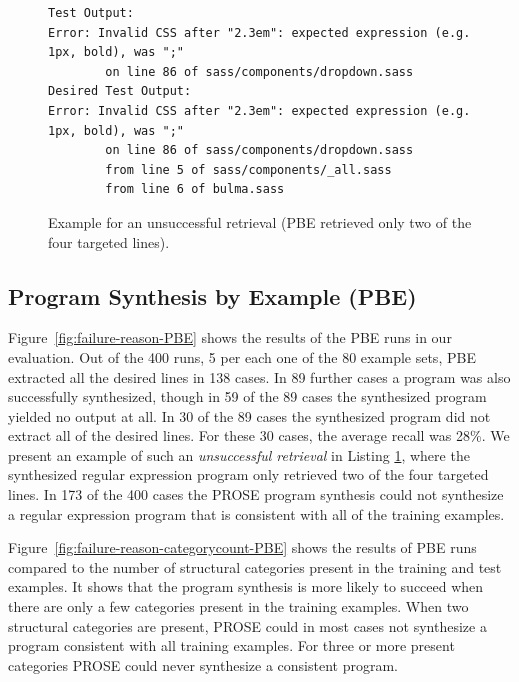 \documentclass[\myrootdir/main.tex]{subfiles}
\begin{document}
\begin{figure}[hb]
  \centering
  \begin{lstlisting}[breaklines=true]
Test Output:
Error: Invalid CSS after "2.3em": expected expression (e.g. 1px, bold), was ";"
        on line 86 of sass/components/dropdown.sass   
Desired Test Output:
Error: Invalid CSS after "2.3em": expected expression (e.g. 1px, bold), was ";"
        on line 86 of sass/components/dropdown.sass
        from line 5 of sass/components/_all.sass
        from line 6 of bulma.sass
  \end{lstlisting}  
  \caption{Example for an unsuccessful retrieval (PBE retrieved only two of the four targeted lines).}
  \label{lst:pbe-unsuccessful}
\end{figure}


\subsection{Program Synthesis by Example (PBE)}
Figure~\ref{fig:failure-reason-PBE} shows the results of the PBE runs in our evaluation.
Out of the 400 runs, 5 per each one of the 80 example sets, PBE extracted all the desired lines in 138 cases.
In 89 further cases a program was also successfully synthesized, though in 59 of the 89 cases the synthesized program yielded no output at all.
In 30 of the 89 cases the synthesized program did not extract all of the desired lines.
For these 30 cases, the average recall was 28\%.
We present an example of such an \emph{unsuccessful retrieval} in Listing \ref{lst:pbe-unsuccessful}, where the synthesized regular expression program only retrieved two of the four targeted lines.
In 173 of the 400 cases the PROSE program synthesis could not synthesize a regular expression program that is consistent with all of the training examples.

Figure~\ref{fig:failure-reason-categorycount-PBE} shows the results of PBE runs compared to the number of structural categories present in the training and test examples.
It shows that the program synthesis is more likely to succeed when there are only a few categories present in the training examples.
When two structural categories are present, PROSE could in most cases not synthesize a program consistent with all training examples.
For three or more present categories PROSE could never synthesize a consistent program.
\end{document}
